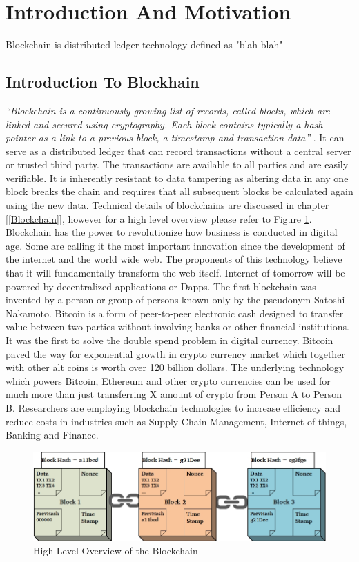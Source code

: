 \section{Introduction And Motivation}
Blockchain is distributed ledger technology defined as "blah blah"
\subsection{Introduction To Blockhain}
\textit{“Blockchain is a continuously growing list of records, called blocks, which are linked and secured using cryptography. Each block contains typically a hash pointer as a link to a previous block, a timestamp and transaction data”} \cite{wiki:001}. It can serve as a distributed ledger that can record transactions without a central server or trusted third party. The transactions are available to all parties and are easily verifiable. It is inherently resistant to data tampering as altering data in any one block breaks the chain and requires that all subsequent blocks be calculated again using the new data. Technical details of blockchains are discussed in chapter [\ref{Blockchain}], however for a high level overview please refer to Figure \ref{fig:blockchain}. Blockchain has the power to revolutionize how business is conducted in digital age. Some are calling it the most important innovation since the development of the internet and the world wide web. The proponents of this technology believe that it will fundamentally transform the web itself. Internet of tomorrow will be powered by decentralized applications or Dapps. The first blockchain was invented by a person or group of persons known only by the pseudonym Satoshi Nakamoto. Bitcoin is a form of peer-to-peer electronic cash designed to transfer value between two parties without involving banks or other financial institutions. It was the first to solve the double spend problem in digital currency. Bitcoin paved the way for exponential growth in crypto currency market which together with other alt coins is worth over 120 billion dollars. The underlying technology which powers Bitcoin, Ethereum and other crypto currencies can be used for much more than just transferring X amount of crypto from Person A to Person B. Researchers are employing blockchain technologies to increase efficiency and reduce costs in industries such as Supply Chain Management, Internet of things, Banking and Finance.

\begin{figure}[b]
	\centering
    \includegraphics[width=160mm,scale=0.5]{figs/blockchain}
	\caption{High Level Overview of the Blockchain}
	\label{fig:blockchain}
\end{figure}
  
